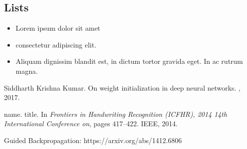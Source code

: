 \documentclass{article}
\begin{document}
\subsection{Lists}
\begin{itemize}
\item Lorem ipsum dolor sit amet
\item consectetur adipiscing elit. 
\item Aliquam dignissim blandit est, in dictum tortor gravida eget. In ac rutrum magna.
\end{itemize}


  


\begin{thebibliography}{1}

Siddharth Krishna Kumar.
\newblock On weight initialization in deep neural networks.
, 2017.

name.
\newblock title.
\newblock In {\em Frontiers in Handwriting Recognition (ICFHR), 2014 14th
  International Conference on}, pages 417--422. IEEE, 2014.

Guided Backpropagation: https://arxiv.org/abs/1412.6806

\end{thebibliography}
\end{document}

